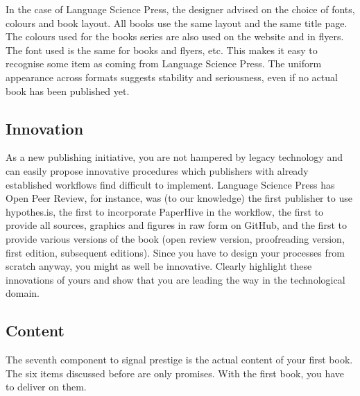 \documentclass[nonflat,smallfont
]{langsci/langscibook}
\begin{document}
In the case of Language Science Press, the designer advised on the choice of fonts, colours and book layout. All books use the same layout and the same title page. The colours used for the books series are also used on the website and in flyers. The font used is the same for books and flyers, etc. This makes it easy to recognise some item as coming from Language Science Press. The uniform appearance across formats suggests stability and seriousness, even if no actual book has been published yet. 

\subsection{Innovation}
As a new publishing initiative, you are not hampered by legacy technology and can easily propose innovative procedures which publishers with already established workflows find difficult to implement. Language Science Press has Open Peer Review, for instance, was (to our knowledge) the first publisher to use hypothes.is, the first to incorporate PaperHive in the workflow, the first to provide all sources, graphics and figures in raw form on GitHub, and the first to provide various versions of the book (open review version, proofreading version, first edition, subsequent editions). Since you have to design your processes from scratch anyway, you might as well be innovative. Clearly highlight these innovations of yours and show that you are leading the way in the technological domain. 

 

\subsection{Content}
The seventh component to signal prestige is the actual content of your first book. The six items discussed before are only promises. With the first book, you have to deliver on them. 
\end{document}
